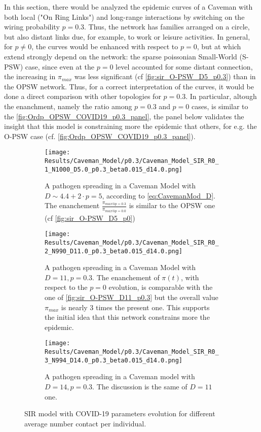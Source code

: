 \documentclass[a4paper,10pt,twoside]{book} %
\theoremstyle{definition}
\begin{document}
In this section, there would be analyzed the epidemic curves of a Caveman with both local ("On Ring Links") and long-range interactions by switching on the wiring probability $p = 0.3$. Thus, the network has families arranged on a circle, but also distant links due, for example, to work or leisure activities.
In general, for $ p \neq 0$, the curves would be enhanced with respect to $ p = 0$, but at which extend strongly depend on the network: the sparse poissonian Small-World (S-PSW) case, since even at the $ p = 0$ level accounted for some distant connection, the increasing in $ \pi_{max} $ was less significant (cf \autoref{fig:sir_O-PSW_D5_p0.3}) than in the OPSW network.  Thus, for a correct interpretation of the curves, it would be done a direct comparison with other topologies for $p = 0.3$. In particular, altough the enanchment, namely the ratio among $ p = 0.3$ and $ p=0$ cases, is similar to the \autoref{fig:Ordp_OPSW_COVID19_p0.3_panel}, the panel below validates the insight that this model is constraining more the epidemic that others, for e.g. the O-PSW case (cf. \autoref{fig:Ordp_OPSW_COVID19_p0.3_panel}).
\begin{figure}[htbp]
	\centering
	\begin{subfigure}{0.9\linewidth}
		\texttt{[image: Results/Caveman\_Model/p0.3/Caveman\_Model\_SIR\_R0\_1\_N1000\_D5.0\_p0.3\_beta0.015\_d14.0.png]}
		\caption{A pathogen spreading in a Caveman Model with $D \sim 4.4+ 2\cdot p = 5$, according to \autoref{eq:CavemanMod_D}. The enanchement $ \frac{\pi_{max @ p = 0.3}}{\pi_{max @ p = 0.0}} $ is similar to the OPSW one (cf \autoref{fig:sir_O-PSW_D5_p0}) }
		\label{fig:sir_CM_D4_OR1_p0.3}
	\end{subfigure}
	\par\smallskip
	\begin{subfigure}{0.9\linewidth}
		\texttt{[image: Results/Caveman\_Model/p0.3/Caveman\_Model\_SIR\_R0\_2\_N990\_D11.0\_p0.3\_beta0.015\_d14.0.png]}
		\caption{A pathogen spreading in a Caveman Model with $D = 11, p = 0.3$. The enanchement of $\pi(t)$, with respect to the $ p=0$ evolution, is comparable with the one of \autoref{fig:sir_O-PSW_D11_p0.3} but the overall value $ \pi_{max}$ is nearly $3$ times the present one. This supports the initial idea that this network constrains more the epidemic.}
		\label{fig:sir_CM_D11_p0.3}
	\end{subfigure}
	\par\smallskip
	\begin{subfigure}{0.9\linewidth}
		\texttt{[image: Results/Caveman\_Model/p0.3/Caveman\_Model\_SIR\_R0\_3\_N994\_D14.0\_p0.3\_beta0.015\_d14.0.png]}
		\caption{A pathogen spreading in a Caveman model with $D = 14, p = 0.3$. The discussion is the same of $D = 11$ one.}
		\label{fig:sir_CM_D13_p0.3}
	\end{subfigure}
	\caption{SIR model with COVID-19 parameters evolution for different average number contact per individual.}
	\label{fig:sir_CM_COVID_p0.3}
\end{figure}
\end{document}
